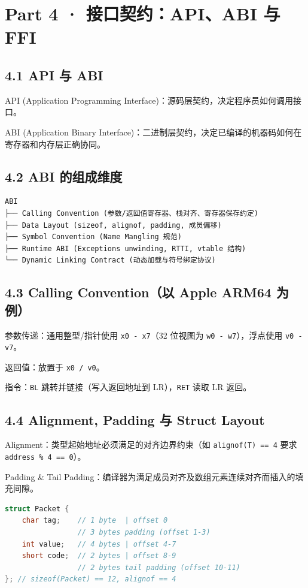 \documentclass[11pt,a4paper]{article}
\begin{document}
\section{Part 4 · 接口契约：API、ABI 与 FFI}
\subsection{4.1 API 与 ABI}
API (Application Programming Interface)：源码层契约，决定程序员如何调用接口。

ABI (Application Binary Interface)：二进制层契约，决定已编译的机器码如何在寄存器和内存层正确协同。

\subsection{4.2 ABI 的组成维度}
\begin{lstlisting}[language=text]
ABI
├── Calling Convention (参数/返回值寄存器、栈对齐、寄存器保存约定)
├── Data Layout (sizeof, alignof, padding, 成员偏移)
├── Symbol Convention (Name Mangling 规范)
├── Runtime ABI (Exceptions unwinding, RTTI, vtable 结构)
└── Dynamic Linking Contract (动态加载与符号绑定协议)
\end{lstlisting}
\subsection{4.3 Calling Convention（以 Apple ARM64 为例）}
参数传递：通用整型/指针使用 \texttt{x0 - x7}（32 位视图为 \texttt{w0 - w7}），浮点使用 \texttt{v0 - v7}。

返回值：放置于 \texttt{x0 / v0}。

指令：\texttt{BL} 跳转并链接（写入返回地址到 LR），\texttt{RET} 读取 LR 返回。

\subsection{4.4 Alignment, Padding 与 Struct Layout}
Alignment：类型起始地址必须满足的对齐边界约束（如 \texttt{alignof(T) == 4} 要求 \texttt{address \% 4 == 0}）。

Padding \& Tail Padding：编译器为满足成员对齐及数组元素连续对齐而插入的填充间隙。

\begin{lstlisting}[language=cpp]
struct Packet {
    char tag;    // 1 byte  | offset 0
                 // 3 bytes padding (offset 1-3)
    int value;   // 4 bytes | offset 4-7
    short code;  // 2 bytes | offset 8-9
                 // 2 bytes tail padding (offset 10-11)
}; // sizeof(Packet) == 12, alignof == 4
\end{lstlisting}
\end{document}
